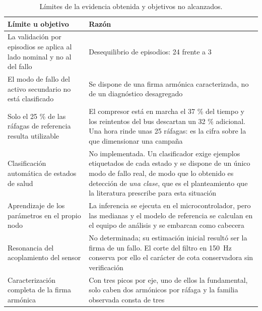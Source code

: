 \begin{table}[ht!]
\caption{Límites de la evidencia obtenida y objetivos no alcanzados.}
\label{table:alcance}
\centering
\begin{tabular}{|p{5.0cm}|p{8.0cm}|}
\hline
\textbf{Límite u objetivo} & \textbf{Razón} \\
\hline
La validación por episodios se aplica al lado nominal y no al del fallo & Desequilibrio de
episodios: 24 frente a 3 \\
\hline
El modo de fallo del activo secundario no está clasificado & Se dispone de una firma armónica
caracterizada, no de un diagnóstico desagregado \\
\hline
Solo el 25 \% de las ráfagas de referencia resulta utilizable & El compresor está en marcha el
37 \% del tiempo y los reintentos del bus descartan un 32 \% adicional. Una hora rinde unas 25
ráfagas: es la cifra sobre la que dimensionar una campaña \\
\hline
Clasificación automática de estados de salud & No implementada. Un clasificador exige ejemplos
etiquetados de cada estado y se dispone de un único modo de fallo real, de modo que lo obtenido es
detección de \textit{una clase}, que es el planteamiento que la literatura prescribe para esta
situación \\
\hline
Aprendizaje de los parámetros en el propio nodo & La inferencia se ejecuta en el
microcontrolador, pero las medianas y el modelo de referencia se calculan en el equipo de
análisis y se embarcan como cabecera \\
\hline
Resonancia del acoplamiento del sensor & No determinada; su estimación inicial resultó ser la
firma de un fallo. El corte del filtro en \mbox{150 Hz} conserva por ello el carácter de cota
conservadora sin verificación \\
\hline
Caracterización completa de la firma armónica & Con tres picos por eje, uno de ellos la
fundamental, solo caben dos armónicos por ráfaga y la familia observada consta de tres \\
\hline
\end{tabular}
\end{table}
